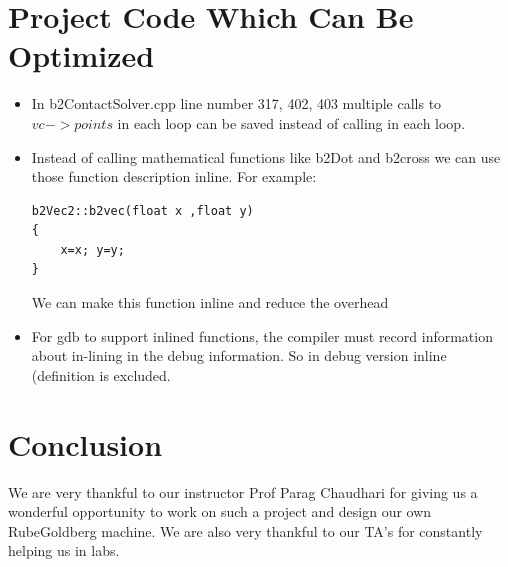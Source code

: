\documentclass[a4paper,11pt]{article}
\begin{document}
\section{Project Code Which Can Be Optimized}
\begin{itemize}
\item In b2ContactSolver.cpp line number 317, 402, 403 multiple calls to $vc->points$ in each loop can be saved instead of calling in each loop.

\item Instead of calling mathematical functions like b2Dot and b2cross we can use those function description inline.
For example: 
\begin{verbatim}
b2Vec2::b2vec(float x ,float y)
{
	x=x; y=y;
}
\end{verbatim}
We can make  this function inline and reduce the overhead
	
	\item For gdb to support inlined functions, the compiler must record information about in-lining in the debug information. So in debug version inline (definition is excluded.

	\end{itemize}

\section{Conclusion}
	We are very thankful to our instructor Prof Parag Chaudhari for giving us a wonderful opportunity to work on such a project and design our own RubeGoldberg machine.
	We are also very thankful to our TA's for constantly helping us in labs.


\end{document}
